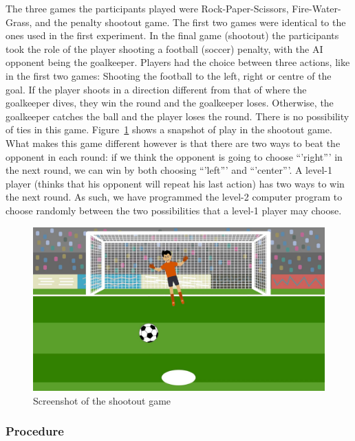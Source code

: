 \documentclass[man,floatsintext]{apa6}
\begin{document}
The three games the participants played were Rock-Paper-Scissors, Fire-Water-Grass, and the penalty shootout game. The first two games were identical to the ones used in the first experiment. In the final game (shootout) the participants took the role of the player shooting a football (soccer) penalty, with the AI opponent being the goalkeeper. Players had the choice between three actions, like in the first two games: Shooting the football to the left, right or centre of the goal. If the player shoots in a direction different from that of where the goalkeeper dives, they win the round and the goalkeeper loses. Otherwise, the goalkeeper catches the ball and the player loses the round. There is no possibility of ties in this game. Figure~\ref{fig:screenshot-shootout} shows a snapshot of play in the shootout game. What makes this game different however is that there are two ways to beat the opponent in each round: if we think the opponent is going to choose \enquote{'right}' in the next round, we can win by both choosing \enquote{'left}' and \enquote{'center}'. A level-1 player (thinks that his opponent will repeat his last action) has two ways to win the next round. As such, we have programmed the level-2 computer program to choose randomly between the two possibilities that a level-1 player may choose.

\begin{figure}

{\centering \includegraphics{images/shootout} 

}

\caption{Screenshot of the shootout game}\label{fig:screenshot-shootout}
\end{figure}

\hypertarget{procedure-1}{%
\subsubsection{Procedure}\label{procedure-1}}
\end{document}
